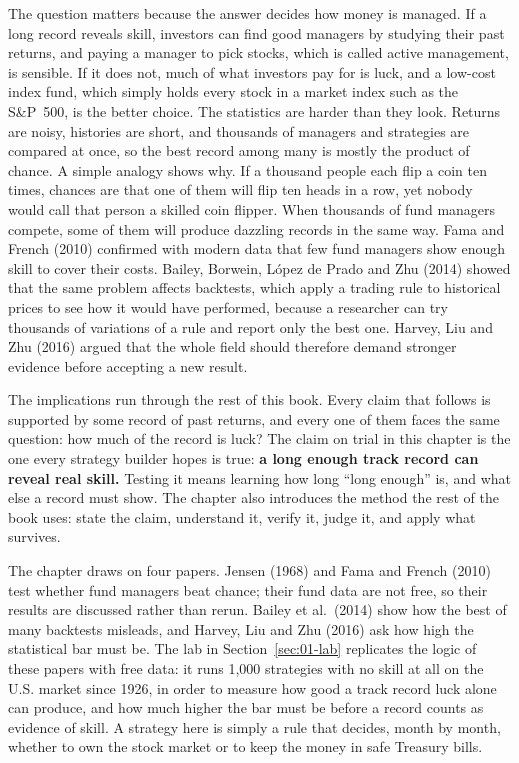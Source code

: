 The question matters because the answer decides how money is managed. If a long record reveals skill, investors can find good managers by studying their past returns, and paying a manager to pick stocks, which is called active management, is sensible. If it does not, much of what investors pay for is luck, and a low-cost index fund, which simply holds every stock in a market index such as the S\&P~500, is the better choice. The statistics are harder than they look. Returns are noisy, histories are short, and thousands of managers and strategies are compared at once, so the best record among many is mostly the product of chance. A simple analogy shows why. If a thousand people each flip a coin ten times, chances are that one of them will flip ten heads in a row, yet nobody would call that person a skilled coin flipper. When thousands of fund managers compete, some of them will produce dazzling records in the same way. Fama and French (2010) confirmed with modern data that few fund managers show enough skill to cover their costs. Bailey, Borwein, L\'opez de Prado and Zhu (2014) showed that the same problem affects backtests, which apply a trading rule to historical prices to see how it would have performed, because a researcher can try thousands of variations of a rule and report only the best one. Harvey, Liu and Zhu (2016) argued that the whole field should therefore demand stronger evidence before accepting a new result.

The implications run through the rest of this book. Every claim that follows is supported by some record of past returns, and every one of them faces the same question: how much of the record is luck? The claim on trial in this chapter is the one every strategy builder hopes is true: \textbf{a long enough track record can reveal real skill.} Testing it means learning how long ``long enough'' is, and what else a record must show. The chapter also introduces the method the rest of the book uses: state the claim, understand it, verify it, judge it, and apply what survives.

The chapter draws on four papers. Jensen (1968) and Fama and French (2010) test whether fund managers beat chance; their fund data are not free, so their results are discussed rather than rerun. Bailey et al.\ (2014) show how the best of many backtests misleads, and Harvey, Liu and Zhu (2016) ask how high the statistical bar must be. The lab in Section~\ref{sec:01-lab} replicates the logic of these papers with free data: it runs 1,000 strategies with no skill at all on the U.S. market since 1926, in order to measure how good a track record luck alone can produce, and how much higher the bar must be before a record counts as evidence of skill. A strategy here is simply a rule that decides, month by month, whether to own the stock market or to keep the money in safe Treasury bills.

